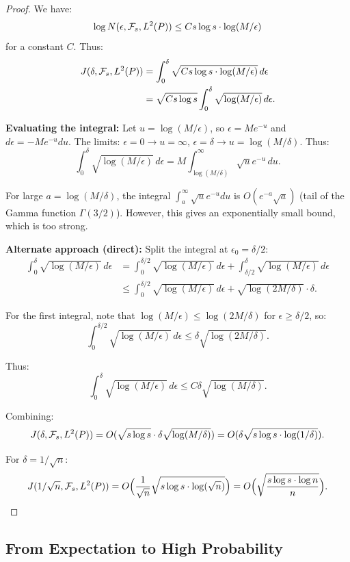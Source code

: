 \documentclass[12pt]{article}
\begin{document}
\begin{proof}
We have:
\[
\log N(\epsilon, \mathcal{F}_s, L^2(P)) \le C s \log s \cdot \log(M/\epsilon)
\]
for a constant $C$. Thus:
\begin{align*}
J(\delta, \mathcal{F}_s, L^2(P))
&= \int_0^\delta \sqrt{C s \log s \cdot \log(M/\epsilon)} \, d\epsilon \\
&= \sqrt{C s \log s} \int_0^\delta \sqrt{\log(M/\epsilon)} \, d\epsilon.
\end{align*}

\textbf{Evaluating the integral:}
Let $u = \log(M/\epsilon)$, so $\epsilon = M e^{-u}$ and $d\epsilon = -M e^{-u} du$. The limits: $\epsilon = 0 \to u = \infty$, $\epsilon = \delta \to u = \log(M/\delta)$. Thus:
\[
\int_0^\delta \sqrt{\log(M/\epsilon)} \, d\epsilon = M \int_{\log(M/\delta)}^\infty \sqrt{u} e^{-u} \, du.
\]

For large $a = \log(M/\delta)$, the integral $\int_a^\infty \sqrt{u} e^{-u} du$ is $O(e^{-a} \sqrt{a})$ (tail of the Gamma function $\Gamma(3/2)$). However, this gives an exponentially small bound, which is too strong.

\textbf{Alternate approach (direct):}
Split the integral at $\epsilon_0 = \delta / 2$:
\begin{align*}
\int_0^\delta \sqrt{\log(M/\epsilon)} \, d\epsilon
&= \int_0^{\delta/2} \sqrt{\log(M/\epsilon)} \, d\epsilon + \int_{\delta/2}^\delta \sqrt{\log(M/\epsilon)} \, d\epsilon \\
&\le \int_0^{\delta/2} \sqrt{\log(M/\epsilon)} \, d\epsilon + \sqrt{\log(2M/\delta)} \cdot \delta.
\end{align*}

For the first integral, note that $\log(M/\epsilon) \le \log(2M/\delta)$ for $\epsilon \ge \delta/2$, so:
\[
\int_0^{\delta/2} \sqrt{\log(M/\epsilon)} \, d\epsilon \le \delta \sqrt{\log(2M/\delta)}.
\]

Thus:
\[
\int_0^\delta \sqrt{\log(M/\epsilon)} \, d\epsilon \le C \delta \sqrt{\log(M/\delta)}.
\]

Combining:
\[
J(\delta, \mathcal{F}_s, L^2(P)) = O(\sqrt{s \log s} \cdot \delta \sqrt{\log(M/\delta)}) = O(\delta \sqrt{s \log s \cdot \log(1/\delta)}).
\]

For $\delta = 1/\sqrt{n}$:
\[
J(1/\sqrt{n}, \mathcal{F}_s, L^2(P)) = O\Bigl( \frac{1}{\sqrt{n}} \sqrt{s \log s \cdot \log(\sqrt{n})} \Bigr) = O\Bigl( \sqrt{\frac{s \log s \cdot \log n}{n}} \Bigr).
\]
\end{proof}

\subsection{From Expectation to High Probability}
\end{document}

